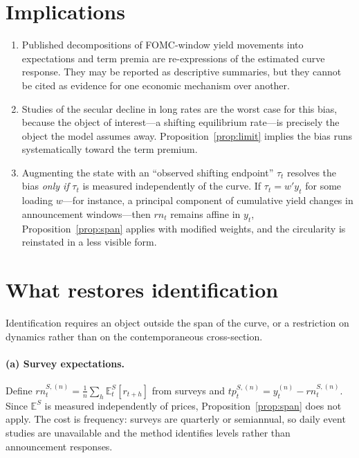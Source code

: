 \documentclass[11pt]{article}
\theoremstyle{remark}\newtheorem{remark}{Remark}
\begin{document}
\section{Implications}

\begin{enumerate}
\item Published decompositions of FOMC-window yield movements into expectations and term premia are re-expressions of the estimated curve response. They may be reported as descriptive summaries, but they cannot be cited as evidence for one economic mechanism over another.
\item Studies of the secular decline in long rates are the worst case for this bias, because the object of interest---a shifting equilibrium rate---is precisely the object the model assumes away. Proposition~\ref{prop:limit} implies the bias runs systematically toward the term premium.
\item Augmenting the state with an ``observed shifting endpoint'' $\tau_t$ resolves the bias \emph{only if} $\tau_t$ is measured independently of the curve. If $\tau_t=w'y_t$ for some loading $w$---for instance, a principal component of cumulative yield changes in announcement windows---then $rn_t$ remains affine in $y_t$, Proposition~\ref{prop:span} applies with modified weights, and the circularity is reinstated in a less visible form.
\end{enumerate}

\section{What restores identification}

Identification requires an object outside the span of the curve, or a restriction on dynamics rather than on the contemporaneous cross-section.

\paragraph{(a) Survey expectations.} Define $rn^{S,(n)}_t=\frac1n\sum_{h}\mathbb{E}^S_t[r_{t+h}]$ from surveys and $tp^{S,(n)}_t=y^{(n)}_t-rn^{S,(n)}_t$. Since $\mathbb{E}^S$ is measured independently of prices, Proposition~\ref{prop:span} does not apply. The cost is frequency: surveys are quarterly or semiannual, so daily event studies are unavailable and the method identifies levels rather than announcement responses.
\end{document}
